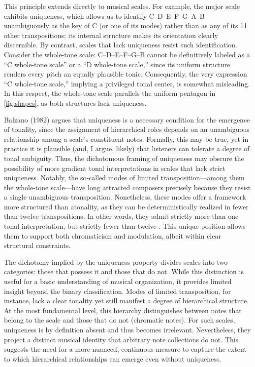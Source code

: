 \documentclass[10pt,twocolumn]{article}
\numberwithin{equation}{section} %
\begin{document}
This principle
extends directly to musical scales.
For example, the major scale exhibits
uniqueness, which allows us to identify C–D–E–F–G–A–B unambiguously as the key
of C (or one of its modes) rather than as any of its 11 other transpositions;
its internal structure makes its orientation clearly discernible.
By contrast,
scales that lack uniqueness resist such identification.
Consider the whole-tone
scale: C–D–E–F\text{$\sharp$}–G\text{$\sharp$}–B\text{$\flat$} cannot be definitively labeled as a “C whole-tone scale” or a “D
whole-tone scale,” since its uniform structure renders every pitch an equally
plausible tonic.
Consequently, the very expression “C whole-tone scale,”
implying a privileged tonal center, is somewhat misleading. In this respect,
the whole-tone scale parallels the uniform pentagon in \autoref{fig:shapes}, as both structures lack uniqueness.

Balzano
(1982) argues that uniqueness is a necessary
condition for the emergence of tonality, since the assignment of hierarchical
roles depends on an unambiguous relationship among a scale’s constituent notes.
Formally, this may be true, yet in practice it is plausible (and, I argue,
likely) that listeners can tolerate a degree of tonal ambiguity. Thus, the
dichotomous framing of uniqueness may obscure the possibility of more gradient
tonal interpretations in scales that lack strict uniqueness. Notably, the so‑called modes of limited
transposition—among them the whole‑tone scale—have long attracted composers precisely because they
resist a single unambiguous transposition. Nonetheless, these modes offer a
framework more structured than atonality, as they can be deterministically
realized in fewer than twelve transpositions. In other words, they admit
strictly more than one tonal interpretation, but strictly fewer than twelve \citep{Messiaen1944}. This unique position allows them to
support both chromaticism and modulation, albeit within clear structural
constraints.

The dichotomy
implied by the uniqueness property divides scales into two categories: those
that possess it and those that do not. While this distinction is useful for a
basic understanding of musical organization, it provides limited insight beyond
the binary classification. Modes of limited transposition, for instance, lack a
clear tonality yet still manifest a degree of hierarchical structure. At the
most fundamental level, this hierarchy distinguishes between notes that belong
to the scale and those that do not (chromatic notes). For such scales,
uniqueness is by definition absent and thus becomes irrelevant. Nevertheless,
they project a distinct musical identity that arbitrary note collections do
not. This suggests the need for a more nuanced, continuous measure to capture
the extent to which hierarchical relationships can emerge even without
uniqueness.
\end{document}
